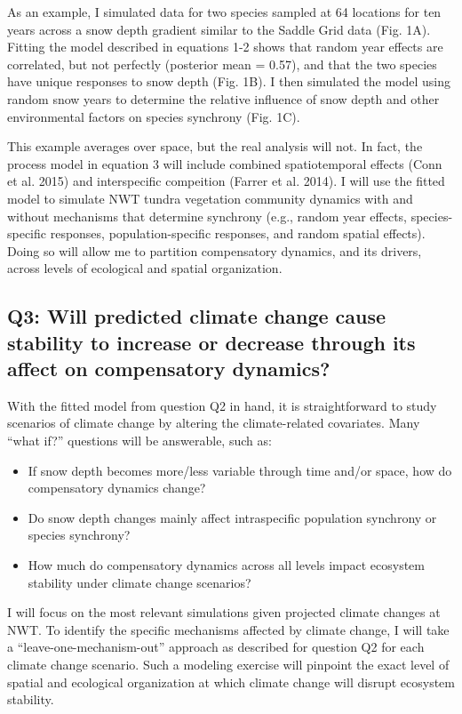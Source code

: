 \documentclass[12pt,]{article}
\begin{document}
As an example, I simulated data for two species sampled at 64 locations
for ten years across a snow depth gradient similar to the Saddle Grid
data (Fig. 1A). Fitting the model described in equations 1-2 shows that
random year effects are correlated, but not perfectly (posterior mean =
0.57), and that the two species have unique responses to snow depth
(Fig. 1B). I then simulated the model using random snow years to
determine the relative influence of snow depth and other environmental
factors on species synchrony (Fig. 1C).

This example averages over space, but the real analysis will not. In
fact, the process model in equation 3 will include combined
spatiotemporal effects (Conn et al. 2015) and interspecific compeition
(Farrer et al. 2014). I will use the fitted model to simulate NWT tundra
vegetation community dynamics with and without mechanisms that determine
synchrony (e.g., random year effects, species-specific responses,
population-specific responses, and random spatial effects). Doing so
will allow me to partition compensatory dynamics, and its drivers,
across levels of ecological and spatial organization.

\subsection{Q3: Will predicted climate change cause stability to increase or decrease through its affect on compensatory dynamics?}

With the fitted model from question Q2 in hand, it is straightforward to
study scenarios of climate change by altering the climate-related
covariates. Many ``what if?'' questions will be answerable, such as:

\begin{itemize}[noitemsep,nolistsep]
\item If snow depth becomes more/less variable through time and/or space, how do compensatory dynamics change?
\item Do snow depth changes mainly affect intraspecific population synchrony or species synchrony?
\item How much do compensatory dynamics across all levels impact ecosystem stability under climate change scenarios?
\end{itemize}

\noindent{}I will focus on the most relevant simulations given projected
climate changes at NWT. To identify the specific mechanisms affected by
climate change, I will take a ``leave-one-mechanism-out'' approach as
described for question Q2 for each climate change scenario. Such a
modeling exercise will pinpoint the exact level of spatial and
ecological organization at which climate change will disrupt ecosystem
stability.
\end{document}
